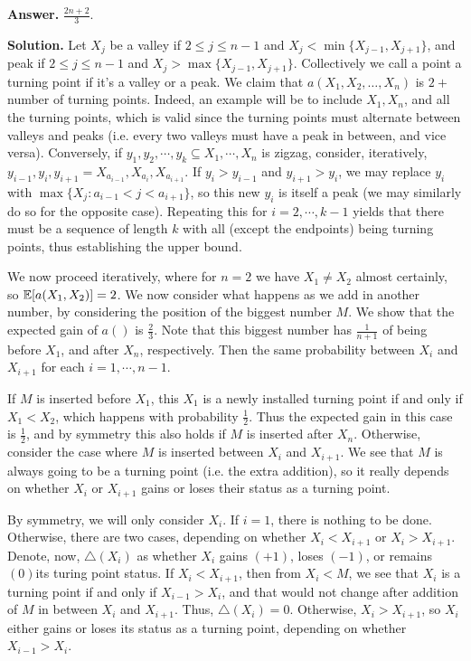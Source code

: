 \documentclass[11pt,a4paper]{article}
\begin{document}
\begin{enumerate}
		\textbf{Answer.} $\frac{2n + 2}{3}$. 
		
		\textbf{Solution.} 
		Let $X_j$ be a valley if $2\le j\le n - 1$ and $X_j < \min \{X_{j - 1}, X_{j + 1}\}$, 
		and peak if $2\le j \le n - 1$ and $X_j > \max \{X_{j - 1}, X_{j + 1}\}$. 
		Collectively we call a point a turning point if it's a valley or a peak. 
		We claim that $a\left(X_1, X_2, \ldots, X_n\right)$ is $2 + $number of turning points. 
		Indeed, an example will be to include $X_1, X_n$, and all the turning points, 
		which is valid since the turning points must alternate between valleys and peaks 
		(i.e. every two valleys must have a peak in between, and vice versa). 
		Conversely, if $y_1, y_2, \cdots, y_k\subseteq X_1, \cdots, X_n$ is zigzag, 
		consider, iteratively, $y_{i - 1}, y_i, y_{i+1} = X_{a_{i-1}}, X_{a_i}, X_{a_{i+1}}$. 
		If $y_i > y_{i-1}$ and $y_{i+1}>y_i$, we may replace $y_i$ with $\max \{X_j: a_{i-1} < j < a_{i+1}\}$, 
		so this new $y_i$ is itself a peak (we may similarly do so for the opposite case). 
		Repeating this for $i=2, \cdots, k - 1$ yields that there must be a sequence of length $k$ with all (except the endpoints) being turning points, 
		thus establishing the upper bound. 
		
		We now proceed iteratively, where for $n=2$ we have $X_1\neq X_2$ almost certainly, 
		so ${\mathbb E}[a(X_1, X_2)]=2$. We now consider what happens as we add in another number, 
		by considering the position of the biggest number $M$. 
		We show that the expected gain of $a()$ is $\frac 23$. 
		Note that this biggest number has $\frac{1}{n + 1}$ of being before $X_1$, 
		and after $X_n$, respectively. 
		Then the same probability between $X_i$ and $X_{i+1}$ for each $i=1, \cdots, n - 1$. 
		
		If $M$ is inserted before $X_1$, this $X_1$ is a newly installed turning point if and only if $X_1 < X_2$, 
		which happens with probability $\frac 12$. 
		Thus the expected gain in this case is $\frac 12$, 
		and by symmetry this also holds if $M$ is inserted after $X_n$. 
		Otherwise, consider the case where $M$ is inserted between $X_i$ and $X_{i + 1}$. 
		We see that $M$ is always going to be a turning point (i.e. the extra addition), 
		so it really depends on whether $X_i$ or $X_{i + 1}$ gains or loses their status as a turning point. 
		
		By symmetry, we will only consider $X_i$. If $i = 1$, 
		there is nothing to be done. 
		Otherwise, there are two cases, depending on whether $X_i < X_{i + 1}$ or $X_i > X_{i + 1}$. 
		Denote, now, $\triangle (X_i)$ as whether $X_i$ gains $(+1)$, loses $(-1)$, 
		or remains $(0)$its turing point status. 
		If $X_i < X_{i + 1}$, then from $X_i < M$, we see that $X_i$ is a turning point if and only if $X_{i - 1} > X_i$, 
		and that would not change after addition of $M$ in between $X_i$ and $X_{i + 1}$. 
		Thus, $\triangle (X_i) = 0$. 
		Otherwise, $X_i > X_{i + 1}$, so $X_i$ either gains or loses its status as a turning point, 
		depending on whether $X_{i - 1} > X_i$. 
		

\end{enumerate}
\end{document}
